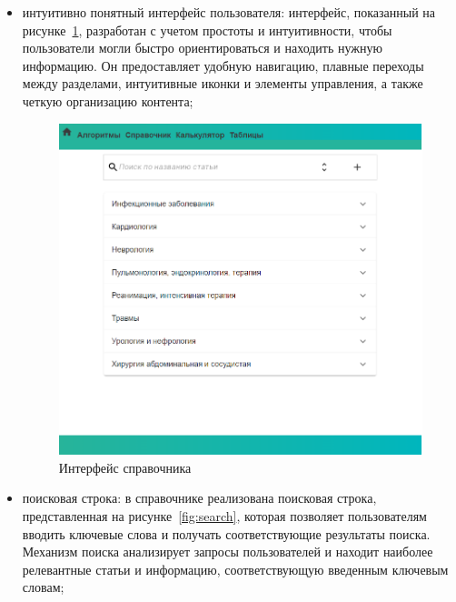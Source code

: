 \begin{itemize}
    \item интуитивно понятный интерфейс пользователя: интерфейс, показанный на рисунке~\ref{fig:main-page}, разработан с учетом простоты и интуитивности, чтобы пользователи могли быстро ориентироваться и находить нужную информацию. Он предоставляет удобную навигацию, плавные переходы между разделами, интуитивные иконки и элементы управления, а также четкую организацию контента;

\begin{figure}
  \includegraphics[scale=0.6]{styles/diploma/inc/ГлСтраница.png}
  \caption{Интерфейс справочника}
  \label{fig:main-page}
\end{figure}

    \item поисковая строка: в справочнике реализована поисковая строка, представленная на рисунке~\ref{fig:search}, которая позволяет пользователям вводить ключевые слова и получать соответствующие результаты поиска. Механизм поиска анализирует запросы пользователей и находит наиболее релевантные статьи и информацию, соответствующую введенным ключевым словам;


\end{itemize}

